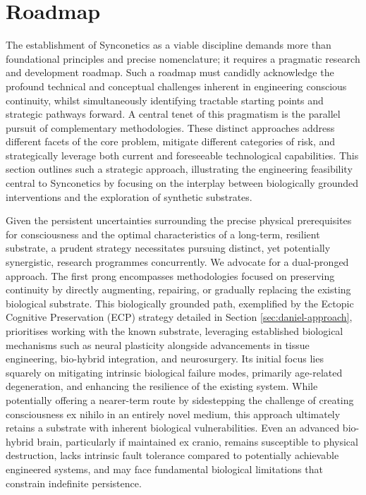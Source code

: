 \documentclass[10pt]{article}
\begin{document}
\begin{sloppypar}
  \section{Roadmap}
  \label{sec:roadmap}

  The establishment of Synconetics as a viable discipline demands more than foundational principles and precise nomenclature; it requires a pragmatic research and development roadmap. Such a roadmap must candidly acknowledge the profound technical and conceptual challenges inherent in engineering conscious continuity, whilst simultaneously identifying tractable starting points and strategic pathways forward. A central tenet of this pragmatism is the parallel pursuit of complementary methodologies. These distinct approaches address different facets of the core problem, mitigate different categories of risk, and strategically leverage both current and foreseeable technological capabilities. This section outlines such a strategic approach, illustrating the engineering feasibility central to Synconetics by focusing on the interplay between biologically grounded interventions and the exploration of synthetic substrates.

  Given the persistent uncertainties surrounding the precise physical prerequisites for consciousness and the optimal characteristics of a long-term, resilient substrate, a prudent strategy necessitates pursuing distinct, yet potentially synergistic, research programmes concurrently. We advocate for a dual-pronged approach. The first prong encompasses methodologies focused on preserving continuity by directly augmenting, repairing, or gradually replacing the existing biological substrate. This biologically grounded path, exemplified by the Ectopic Cognitive Preservation (ECP) strategy detailed in Section \ref{sec:daniel-approach}, prioritises working with the known substrate, leveraging established biological mechanisms such as neural plasticity alongside advancements in tissue engineering, bio-hybrid integration, and neurosurgery. Its initial focus lies squarely on mitigating intrinsic biological failure modes, primarily age-related degeneration, and enhancing the resilience of the existing system. While potentially offering a nearer-term route by sidestepping the challenge of creating consciousness ex nihilo in an entirely novel medium, this approach ultimately retains a substrate with inherent biological vulnerabilities. Even an advanced bio-hybrid brain, particularly if maintained ex cranio, remains susceptible to physical destruction, lacks intrinsic fault tolerance compared to potentially achievable engineered systems, and may face fundamental biological limitations that constrain indefinite persistence.


\end{sloppypar}
\end{document}
